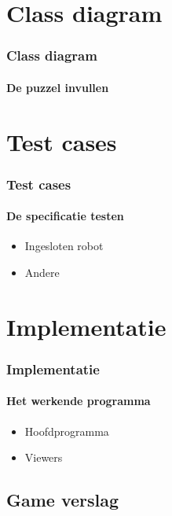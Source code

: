 \documentclass{beamer}
\begin{document}
	\section{Class diagram}
	\begin{frame}
		\frametitle{Class diagram}
		\framesubtitle{De puzzel invullen}
		
	\end{frame}

	\section{Test cases}
	\begin{frame}
		\frametitle{Test cases}
		\framesubtitle{De specificatie testen}
		
		\begin{itemize}[<+->]
			\item Ingesloten robot
			\item Andere
		\end{itemize}
	\end{frame}

	\section{Implementatie}
	\begin{frame}
		\frametitle{Implementatie}
		\framesubtitle{Het werkende programma}
		\begin{itemize}[<+->]
                        \item Hoofdprogramma
                        \item Viewers
                \end{itemize}
	\end{frame}
	\subsection{Game verslag}
	\begin{frame}
	\end{frame}
\end{document}
